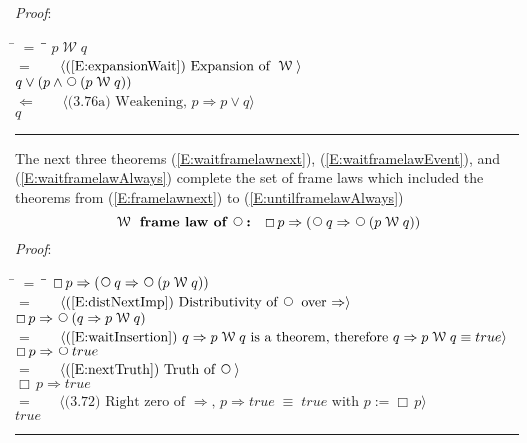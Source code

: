 \documentclass[12pt, fleqn, leqno]{article}
\newcommand{\lgap}{2pt}                             %
\newcommand{\mymathindent}{24pt}                    %
\newcommand{\equivs}{\ensuremath{\;\equiv\;}}       %
\newcommand{\impl}{\ensuremath{\Rightarrow}}        %
\newcommand{\foll}{\ensuremath{\Leftarrow}}         %
\newcommand{\Wait}{\;\mathcal{W}\;}
\newcommand{\Next}{\;\,\text{\raisebox{3.5pt}{\circle{6}}}}
\newcommand{\Always}{\Box\,}
\newcommand{\myqed}{\rule[-.23ex]{1.2ex}{2.0ex}}
\newcommand{\myqedtab}{\hspace{384pt}}              %
\newcommand{\Gll} {\langle}                         %
\newcommand{\Ggg} {\rangle}                         %
\newcommand{\Hint}[1]     {\ \ \ $\Gll              \mbox{#1} \Ggg$ }   %
\begin{document}
\emph{Proof}:
\begin{tabbing}
\hspace{\mymathindent} \= $= \;$ \= \myqedtab \= \kill
\> \> $p \Wait q$\\[\lgap]
\> $=$ \> \Hint{(\ref{E:expansionWait}) Expansion of $\Wait$} \\[\lgap]
\> \> $q \lor (p \land \Next(p \Wait q))$\\[\lgap]
\> $\foll$ \> \Hint{(3.76a) Weakening, $p\impl p\lor q$} \\[\lgap]
\> \> $q$ \quad \myqed
\end{tabbing}

The next three theorems 
(\ref{E:waitframelawnext}),
(\ref{E:waitframelawEvent}),
and
(\ref{E:waitframelawAlways})
complete the set of frame laws which included the theorems from (\ref{E:framelawnext}) to (\ref{E:untilframelawAlways})
\begin{equation}\label{E:waitframelawnext}
\textbf{$\Wait$ frame law of $\Next$:}\quad \Always p \impl (\Next q \impl \Next (p \Wait q))
\end{equation}
\emph{Proof}:
\begin{tabbing}
\hspace{\mymathindent} \= $= \;$ \= \myqedtab \= \kill
	\> \>   $\Always p \impl (\Next q \impl \Next (p \Wait q))$\\[\lgap]
	\> $=$  \>  \Hint{(\ref{E:distNextImp}) Distributivity of $\Next$ over $\impl$}\\[\lgap]
	\> \>   $\Always p \impl \Next (q \impl p \Wait q)$\\[\lgap]
	\> $=$  \>  \Hint{(\ref{E:waitInsertion}) $q \impl p \Wait q$ is a theorem, therefore $q \impl p \Wait q \equiv true$}\\[\lgap]
	\> \>   $\Always p \impl \Next true$\\[\lgap]
	\> $=$  \>  \Hint{(\ref{E:nextTruth}) Truth of $\Next$}\\[\lgap]
	\> \>   $\Always p \impl true$\\[\lgap]
	\> $=$  \>  \Hint{(3.72) Right zero of $\impl$, $p\impl true \equivs true$ with $p := \Always p$}\\[\lgap]
	\> \>   $true$ \quad \myqed
\end{tabbing}
\end{document}
